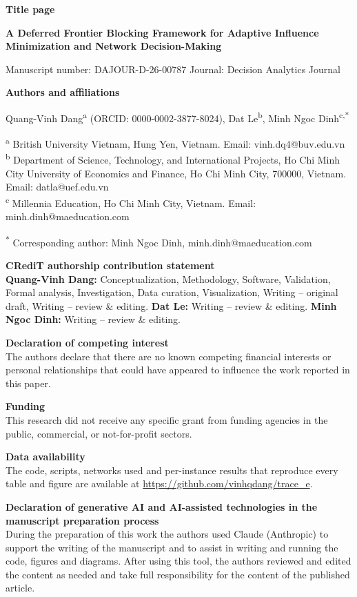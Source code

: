 \documentclass[11pt]{article}
\begin{document}
{\large\bfseries Title page}

{\Large\bfseries A Deferred Frontier Blocking Framework for Adaptive Influence Minimization and Network Decision-Making}

Manuscript number: DAJOUR-D-26-00787 \hfill Journal: Decision Analytics Journal

\textbf{Authors and affiliations}

Quang-Vinh Dang\textsuperscript{a} (ORCID: 0000-0002-3877-8024), \quad
Dat Le\textsuperscript{b}, \quad
Minh Ngoc Dinh\textsuperscript{c,*}

\textsuperscript{a} British University Vietnam, Hung Yen, Vietnam. Email: vinh.dq4@buv.edu.vn\\
\textsuperscript{b} Department of Science, Technology, and International Projects, Ho Chi Minh City University of Economics and Finance, Ho Chi Minh City, 700000, Vietnam. Email: datla@uef.edu.vn\\
\textsuperscript{c} Millennia Education, Ho Chi Minh City, Vietnam. Email: minh.dinh@maeducation.com

\textsuperscript{*} Corresponding author: Minh Ngoc Dinh, minh.dinh@maeducation.com

\textbf{CRediT authorship contribution statement}\\
\textbf{Quang-Vinh Dang:} Conceptualization, Methodology, Software, Validation, Formal analysis, Investigation, Data curation, Visualization, Writing -- original draft, Writing -- review \& editing. \textbf{Dat Le:} Writing -- review \& editing. \textbf{Minh Ngoc Dinh:} Writing -- review \& editing.

\textbf{Declaration of competing interest}\\
The authors declare that there are no known competing financial interests or personal relationships that could have appeared to influence the work reported in this paper.

\textbf{Funding}\\
This research did not receive any specific grant from funding agencies in the public, commercial, or not-for-profit sectors.

\textbf{Data availability}\\
The code, scripts, networks used and per-instance results that reproduce every table and figure are available at \url{https://github.com/vinhqdang/trace_e}.

\textbf{Declaration of generative AI and AI-assisted technologies in the manuscript preparation process}\\
During the preparation of this work the authors used Claude (Anthropic) to support the writing of the manuscript and to assist in writing and running the code, figures and diagrams. After using this tool, the authors reviewed and edited the content as needed and take full responsibility for the content of the published article.
\end{document}

